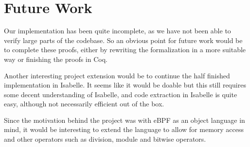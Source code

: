 \section{Future Work}\label{sec:future}
Our implementation has been quite incomplete, as we have not been able to verify
large parts of the codebase. So an obvious point for future work would be to complete these proofs,
either by rewriting the formalization in a more suitable way or finishing the proofs in Coq.

Another interesting project extension would be to continue the half finished implementation in Isabelle.
It seems like it would be doable but this still requires some decent understanding of Isabelle,
and code extraction in Isabelle is quite easy, although not necessarily efficient out of the box.

Since the motivation behind the project was with eBPF as an object language in mind, it would be interesting to
extend the language to allow for memory access and other operators such as division, module and bitwise operators.